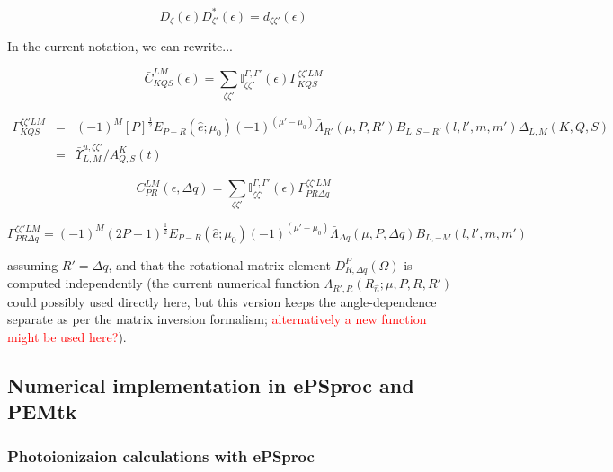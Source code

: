 \documentclass[10pt]{article}
\begin{document}
\begin{equation}
D_{\zeta}(\epsilon)D_{\zeta'}^{*}(\epsilon)=d_{\zeta\zeta'}(\epsilon)
\end{equation}

In the current notation, we can rewrite...

\begin{equation}
\bar{C}_{KQS}^{LM}(\epsilon)=\sum_{\zeta\zeta'}\mathbb{I}_{\zeta\zeta'}^{\Gamma,\Gamma'}(\epsilon)\Gamma_{KQS}^{\zeta\zeta'LM}
\end{equation}

\begin{eqnarray}
\Gamma_{KQS}^{\zeta\zeta'LM} & = & (-1)^{M}[P]^{\frac{1}{2}}E_{P-R}(\hat{e};\mu_{0})(-1)^{(\mu'-\mu_{0})}\bar{\Lambda}_{R'}(\mu,P,R')B_{L,S-R'}(l,l',m,m')\Delta_{L,M}(K,Q,S)\\
 & = & \bar{\varUpsilon}_{L,M}^{u,\zeta\zeta'}/A_{Q,S}^{K}(t)
\end{eqnarray}

\begin{equation}
C_{PR}^{LM}(\epsilon,\Delta q)=\sum_{\zeta\zeta'}\mathbb{I}_{\zeta\zeta'}^{\Gamma,\Gamma'}(\epsilon)\Gamma_{PR\Delta q}^{\zeta\zeta'LM}
\end{equation}

\begin{equation}
\Gamma_{PR\Delta q}^{\zeta\zeta'LM}=(-1)^{M}(2P+1)^{\frac{1}{2}}E_{P-R}(\hat{e};\mu_{0})(-1)^{(\mu'-\mu_{0})}\bar{\Lambda}_{\Delta q}(\mu,P,\Delta q)B_{L,-M}(l,l',m,m')
\end{equation}

assuming $R'=\Delta q$, and that the rotational matrix element $D_{R,\Delta q}^{P}(\Omega)$
is computed independently (the current numerical function $\Lambda_{R',R}(R_{\hat{n}};\mu,P,R,R')$
could possibly used directly here, but this version keeps the angle-dependence
separate as per the matrix inversion formalism; \textcolor{red}{alternatively
a new function might be used here?}).

\subsection{Numerical implementation in ePSproc and PEMtk\label{sec:numerical-notes}}

\subsubsection{Photoionizaion calculations with ePSproc}
\end{document}
